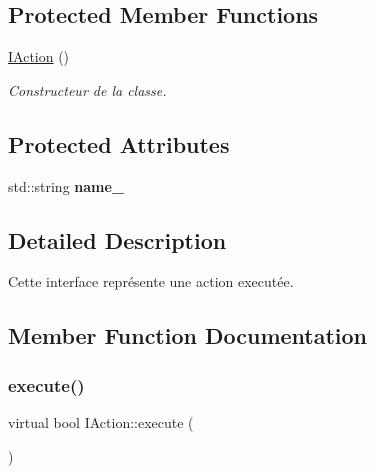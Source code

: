 \subsection*{Protected Member Functions}
\begin{DoxyCompactItemize}
\item 
\mbox{\label{classIAction_a8add7e99c248231a9f29365a2ff187f6}} 
\hyperlink{classIAction_a8add7e99c248231a9f29365a2ff187f6}{I\+Action} ()
\begin{DoxyCompactList}\small\item\em Constructeur de la classe. \end{DoxyCompactList}\end{DoxyCompactItemize}
\subsection*{Protected Attributes}
\begin{DoxyCompactItemize}
\item 
\mbox{\label{classIAction_a9745b2e0ed84329cf4836602c87cd6be}} 
std\+::string {\bfseries name\+\_\+}
\end{DoxyCompactItemize}


\subsection{Detailed Description}
Cette interface représente une action executée. 

\subsection{Member Function Documentation}
\mbox{\label{classIAction_a8fabb15178fbba329f1458326c1d7c94}} 
\subsubsection{\texorpdfstring{execute()}{execute()}}
{\footnotesize\ttfamily virtual bool I\+Action\+::execute (\begin{DoxyParamCaption}{ }\end{DoxyParamCaption})\hspace{0.3cm}{\ttfamily [pure virtual]}}



